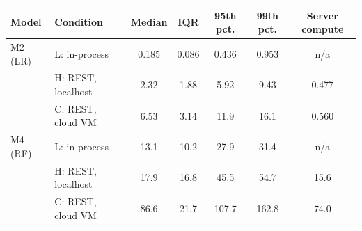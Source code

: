 \begin{tabular}{llccccc}
\toprule
Model & Condition & Median & IQR & 95th pct. & 99th pct. & Server compute \\
\midrule
M2 (LR) & L: in-process & 0.185 & 0.086 & 0.436 & 0.953 & n/a \\
 & H: REST, localhost & 2.32 & 1.88 & 5.92 & 9.43 & 0.477 \\
 & C: REST, cloud VM & 6.53 & 3.14 & 11.9 & 16.1 & 0.560 \\
\addlinespace
M4 (RF) & L: in-process & 13.1 & 10.2 & 27.9 & 31.4 & n/a \\
 & H: REST, localhost & 17.9 & 16.8 & 45.5 & 54.7 & 15.6 \\
 & C: REST, cloud VM & 86.6 & 21.7 & 107.7 & 162.8 & 74.0 \\
\bottomrule
\end{tabular}
